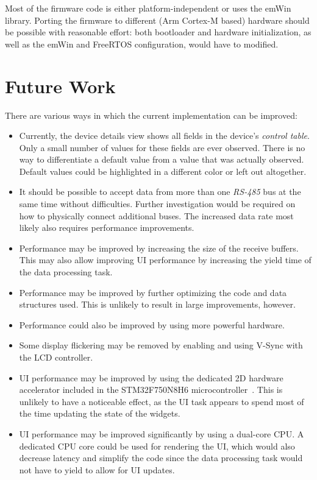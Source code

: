 Most of the firmware code is either platform-independent or uses the emWin library. Porting the
firmware to different (Arm Cortex-M based) hardware should be possible with reasonable effort: both
bootloader and hardware initialization, as well as the emWin and FreeRTOS configuration, would have to
modified.

\section{Future Work}
\label{conclusion-and-future-work/future-work}

There are various ways in which the current implementation can be improved:

\begin{itemize}
    \item Currently, the device details view shows all fields in the device's \textit{control table}.
          Only a small number of values for these fields are ever observed. There is no way to
          differentiate a default value from a value that was actually observed. Default values could
          be highlighted in a different color or left out altogether.
    \item It should be possible to accept data from more than one \textit{RS-485} bus at the same time
          without difficulties. Further investigation would be required on how to physically connect
          additional buses. The increased data rate most likely also requires performance improvements.
    \item Performance may be improved by increasing the size of the receive buffers. This may also
          allow improving UI performance by increasing the yield time of the data processing task.
    \item Performance may be improved by further optimizing the code and data structures used. This
          is unlikely to result in large improvements, however.
    \item Performance could also be improved by using more powerful hardware.
    \item Some display flickering may be removed by enabling and using V-Sync with the LCD controller.
    \item UI performance may be improved by using the dedicated 2D hardware accelerator included in
          the STM32F750N8H6 microcontroller~\cite{mcu-ref-manual}. This is unlikely to have a noticeable
          effect, as the UI task appears to spend most of the time updating the state of the widgets.
    \item UI performance may be improved significantly by using a dual-core CPU. A dedicated CPU core
          could be used for rendering the UI, which would also decrease latency and simplify the
          code since the data processing task would not have to yield to allow for UI updates.
\end{itemize}
